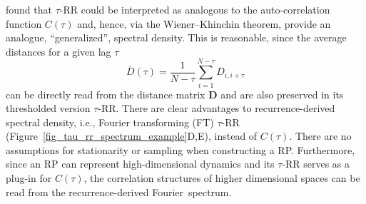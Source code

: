 \documentclass[entropy,article,accept,pdftex,moreauthors]{Definitions/mdpi}
\begin{document}
\citet{Zbilut2008} found that $\tau$-RR could be interpreted as analogous to the auto-correlation function $C(\tau)$ and, hence, via the Wiener--Khinchin theorem, provide an analogue,
``generalized'', spectral density. This is reasonable, since the average distances for a given lag $\tau$ 
\begin{equation}
\overline{D}(\tau) = \frac{1}{N-\tau}\sum_{i=1}^{N-\tau} D_{i, i+\tau}
\end{equation}
can be directly read from the distance matrix $\mathbf{D}$ and are also preserved in its thresholded version $\tau$-RR. There are clear advantages to recurrence-derived spectral density, 
i.e., Fourier transforming (FT) $\tau$-RR (Figure~\ref{fig_tau_rr_spectrum_example}D,E), instead 
of $C(\tau)$. There are no assumptions for stationarity or sampling when constructing a RP.
Furthermore, since an RP can represent high-dimensional dynamics and its $\tau$-RR serves as a plug-in for $C(\tau)$, the correlation structures of higher dimensional spaces can be read from 
the recurrence-derived Fourier~spectrum.\\
\vspace{-6pt}
\end{document}
